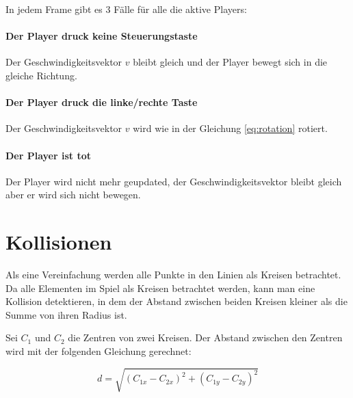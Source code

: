 \documentclass[doktyp=studarbeit]{TUBAFarbeiten}
\begin{document}
In jedem Frame gibt es 3 Fälle für alle die aktive Players:

\paragraph{Der Player druck keine Steuerungstaste}
Der Geschwindigkeitsvektor $v$ bleibt gleich und der Player bewegt sich
in die gleiche Richtung.

\paragraph{Der Player druck die linke/rechte Taste}
Der Geschwindigkeitsvektor $v$ wird wie in der Gleichung \ref{eq:rotation}
rotiert.

\paragraph{Der Player ist tot}
Der Player wird nicht mehr geupdated, der Geschwindigkeitsvektor bleibt gleich
aber er wird sich nicht bewegen.

\section{Kollisionen}

Als eine Vereinfachung werden alle Punkte in den Linien als Kreisen betrachtet.
Da alle Elementen im Spiel als Kreisen betrachtet werden, kann man eine Kollision
detektieren, in dem der Abstand zwischen beiden Kreisen kleiner als die Summe
von ihren Radius ist.

Sei $C_{1}$ und $C_{2}$ die Zentren von zwei Kreisen. Der Abstand zwischen den 
Zentren wird mit der folgenden Gleichung gerechnet:

\begin{equation}
    d = \sqrt{(C_{1x} - C_{2x})^2 + (C_{1y} - C_{2y})^2}
\end{equation}
\end{document}
